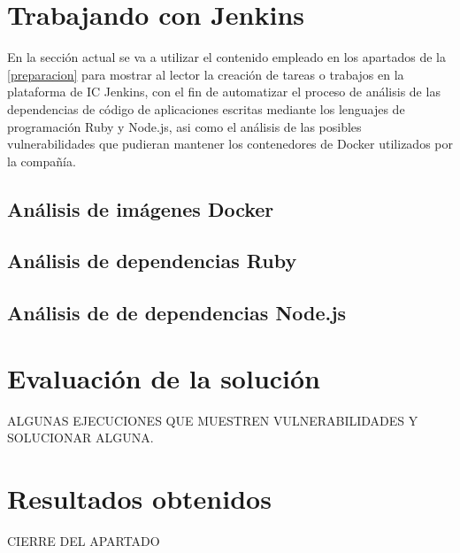 \section{Trabajando con Jenkins}\label{trabajando_jenkins}

En la sección actual se va a utilizar el contenido empleado en los apartados de la \autoref{preparacion} para mostrar al lector la creación de tareas o trabajos en la plataforma de \gls{IC} Jenkins, con el fin de automatizar el proceso de análisis de las dependencias de código de aplicaciones escritas mediante los lenguajes de programación Ruby y Node.js, asi como el análisis de las posibles vulnerabilidades que pudieran mantener los contenedores de Docker utilizados por la compañía.

\subsection{Análisis de imágenes Docker}

\subsection{Análisis de dependencias Ruby}

\subsection{Análisis de de dependencias Node.js}

\section{Evaluación de la solución}

ALGUNAS EJECUCIONES QUE MUESTREN VULNERABILIDADES Y SOLUCIONAR ALGUNA.

\section{Resultados obtenidos}

CIERRE DEL APARTADO

\endinput
